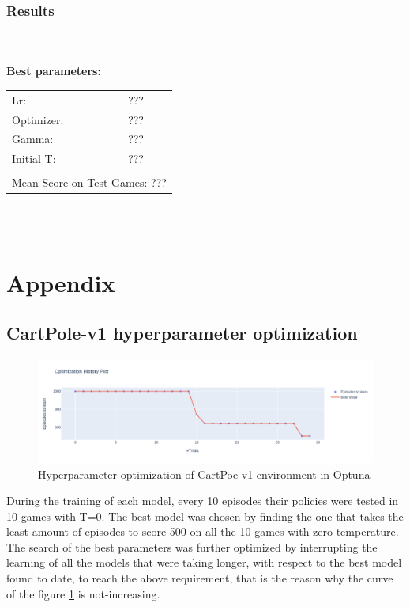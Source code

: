 \documentclass[11pt,a4paper,twocolumn]{IEEEtran}
\newcommand{\thinsepline}{\noindent\makebox[\linewidth]{\rule{7.5cm}{0.02pt}}}
\begin{document}
			\subsubsection{\textbf{Results}}\text{   }\\
			\thinsepline\\
			\textbf{Best parameters:}\medskip\\
			\begin{tabular}{ll}
				Lr: & ??? \\
				Optimizer: & ??? \\
				Gamma: & ??? \\
				Initial T:& ??? \\
				\hline\\
				\multicolumn{2}{l}{Mean Score on Test Games: ??? }
				
			\end{tabular}\\
			\thinsepline\medskip\\
			\nocite{brockman2016openai}
			\nocite{mnih2013playing}
			\printbibliography
	\newpage
	\onecolumn
	\section{\textbf{Appendix}}
		\subsection{\textbf{CartPole-v1 hyperparameter optimization}}
		\begin{figure}[h]
			\centering\includegraphics[width=1\linewidth]{../imgs/optuna_cartpole}\vspace*{-.7cm}
			\caption{Hyperparameter optimization of CartPoe-v1 environment in Optuna}
			\label{fig:cartpoleopt}
		\end{figure}
		During the training of each model, every 10 episodes their policies were tested in 10 games with T=0. The best model was chosen by finding the one that takes the least amount of episodes to score 500 on all the 10 games with zero temperature.\medskip\\
		The search of the best parameters was further optimized by interrupting the learning of all the models that were taking longer, with respect to the best model found to date, to reach the above requirement, that is the reason why the curve of the figure \ref{fig:cartpoleopt} is not-increasing.
\end{document}
